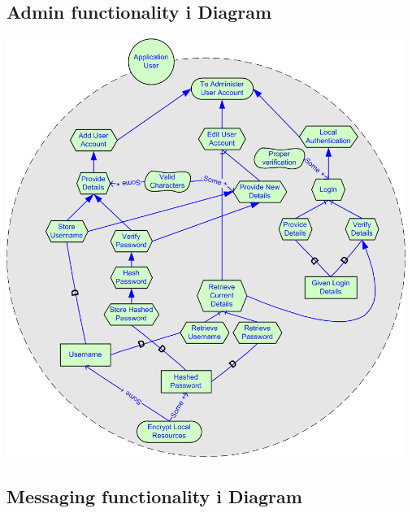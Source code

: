 \subsection*{Admin functionality i\text{*} Diagram}

\begin{center}
 \includegraphics[width=13cm]{diagrams/IStarDiagrams/istarAdmin.png}
\end{center}

\subsection*{Messaging functionality i\text{*} Diagram}


